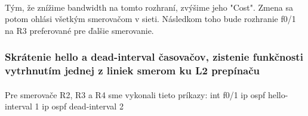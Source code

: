 \documentclass[12pt,twoside,a4paper]{article}
\begin{document}
\paragraph{}
Tým, že znížime bandwidth na tomto rozhraní, zvýšime jeho "Cost". Zmena sa potom ohlási všetkým smerovačom v sieti. Následkom toho bude rozhranie f0/1 na R3 preferované pre ďalšie smerovanie.


\subsubsection*{Skrátenie hello a dead-interval časovačov, zistenie funkčnosti vytrhnutím jednej z liniek smerom ku L2 prepínaču}
\paragraph{}
Pre smerovače R2, R3 a R4 sme vykonali tieto príkazy:
int f0/1
    ip ospf hello-interval 1
    ip ospf dead-interval 2
\end{document}

